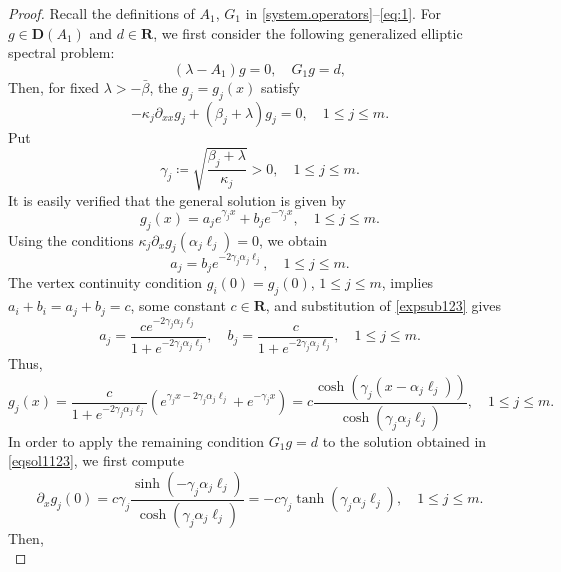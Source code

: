 \documentclass[a4paper,11pt,reqno]{amsart}
\def\R{\mathbf{R}}
\theoremstyle{plain}
\numberwithin{equation}{section}
\begin{document}
\begin{proof}
Recall the definitions of $A_1$, $G_1$ in \eqref{system.operators}--\eqref{eq:1}. For $g\in \bm{D}({A}_1)$ and $d\in \R$, we first consider the following generalized elliptic spectral problem:
\begin{equation*}
(\lambda-A_1)g=0,\quad G_1 g=d,
\end{equation*}
Then, for fixed $\lambda > -\bar{\beta}$, the $g_j=g_j(x)$ satisfy
\begin{equation*}
-\kappa_j \partial_{xx} g_j + (\beta_j+\lambda) g_j = 0,\quad 1 \le j\le m.
\end{equation*}
Put
\begin{equation}\label{expsubd123}
 \gamma_j \coloneqq \sqrt{\frac{\beta_j + \lambda}{\kappa_j}} > 0,\quad 1 \le j\le m.
\end{equation}
It is easily verified that the general solution is given by
\begin{equation*}
g_j(x) = a_j e^{\gamma_j x} + b_j e^{-\gamma_j x},\quad 1 \le j\le m.
\end{equation*}
Using the conditions $ \kappa_j \partial_x g_j(\alpha_j \ell_j) = 0$, we obtain
\begin{equation}\label{expsub123}
a_j = b_j e^{-2\gamma_j \alpha_j \ell_j},\quad 1 \le j\le m.
\end{equation}
The vertex continuity condition $g_i(0)=g_j(0)$, $1 \le j\le m$, implies $a_i + b_i =a_j + b_j= c$, some constant $c\in \R$, and substitution of \eqref{expsub123} gives
\begin{equation*}
a_j=\frac{ce^{-2\gamma_j \alpha_j \ell_j}}{1+e^{-2\gamma_j \alpha_j \ell_j}},\quad b_j=\frac{c}{1+e^{-2\gamma_j \alpha_j \ell_j}},\quad 1 \le j\le m.
\end{equation*}
Thus,
\begin{equation}\label{eqsol1123}
g_j(x) = \frac{c}{1 + e^{-2\gamma_j \alpha_j \ell_j}} \left( e^{\gamma_j x - 2\gamma_j \alpha_j \ell_j} + e^{-\gamma_j x} \right)
=c\frac{\cosh(\gamma_j (x - \alpha_j \ell_j))}{\cosh(\gamma_j \alpha_j \ell_j)},\quad 1 \le j\le m.
\end{equation}
In order to apply the remaining condition $G_1 g = d$ to the solution obtained in \eqref{eqsol1123}, we first compute
\begin{equation*}
\partial_x g_j(0) = c\gamma_j\frac{\sinh(-\gamma_j \alpha_j \ell_j)}{\cosh(\gamma_j \alpha_j \ell_j)}=-c\gamma_j \tanh(\gamma_j \alpha_j \ell_j),\quad 1 \le j\le m.
\end{equation*}
Then,
\begin{equation*}

\end{equation*}
\end{proof}
\end{document}
